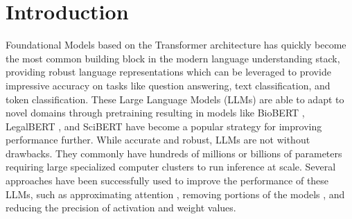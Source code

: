 \section{Introduction}
Foundational Models \cite{Bommasani2021OnTO} based on the Transformer architecture \cite{Vaswani2017AttentionIA} has quickly become the most common building block in the modern language understanding stack, 
providing robust language representations which can be leveraged to provide impressive accuracy on tasks like question answering, text classification, and token classification. These Large Language Models (LLMs) are able to adapt to novel domains through pretraining resulting in models like BioBERT \cite{Lee2020BioBERTAP}, LegalBERT \cite{Chalkidis2020LEGALBERTTM}, and SciBERT \cite{beltagy2019SciBERTAP} have become a popular strategy for improving performance further. While accurate and robust, LLMs are not without drawbacks. 
They commonly have hundreds of millions or billions of parameters requiring large specialized computer clusters to run inference at scale. Several approaches have been successfully used to improve the performance of these LLMs, such as approximating attention \cite{Peng2021RandomFA}, removing portions of the models \cite{Sridhar2020UndividedAA}, and reducing the precision of activation and weight values.\\
